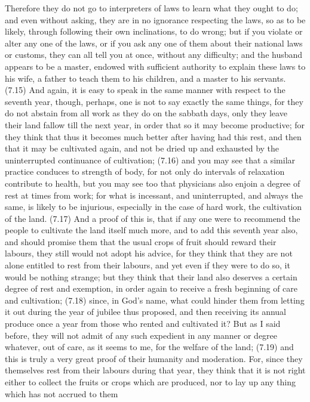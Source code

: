 Therefore they do not go to interpreters of laws to learn what they ought to do; and even without
asking, they are in no ignorance respecting the laws, so as to be likely, through following their own
inclinations, to do wrong; but if you violate or alter any one of the laws, or if you ask any one of them
about their national laws or customs, they can all tell you at once, without any difficulty; and the
husband appears to be a master, endowed with sufficient authority to explain these laws to his wife, a
father to teach them to his children, and a master to his servants. (7.15) And again, it is easy to speak in
the same manner with respect to the seventh year, though, perhaps, one is not to say exactly the same
things, for they do not abstain from all work as they do on the sabbath days, only they leave their land
fallow till the next year, in order that so it may become productive; for they think that thus it becomes
much better after having had this rest, and then that it may be cultivated again, and not be dried up
and exhausted by the uninterrupted continuance of cultivation; (7.16) and you may see that a similar
practice conduces to strength of body, for not only do intervals of relaxation contribute to health, but
you may see too that physicians also enjoin a degree of rest at times from work; for what is incessant,
and uninterrupted, and always the same, is likely to be injurious, especially in the case of hard work, the
cultivation of the land. (7.17) And a proof of this is, that if any one were to recommend the people to
cultivate the land itself much more, and to add this seventh year also, and should promise them that the
usual crops of fruit should reward their labours, they still would not adopt his advice, for they think
that they are not alone entitled to rest from their labours, and yet even if they were to do so, it would be
nothing strange; but they think that their land also deserves a certain degree of rest and exemption, in
order again to receive a fresh beginning of care and cultivation; (7.18) since, in God's name, what
could hinder them from letting it out during the year of jubilee thus proposed, and then receiving its
annual produce once a year from those who rented and cultivated it? But as I said before, they will not
admit of any such expedient in any manner or degree whatever, out of care, as it seems to me, for the
welfare of the land; (7.19) and this is truly a very great proof of their humanity and moderation. For,
since they themselves rest from their labours during that year, they think that it is not right either to
collect the fruits or crops which are produced, nor to lay up any thing which has not accrued to them

